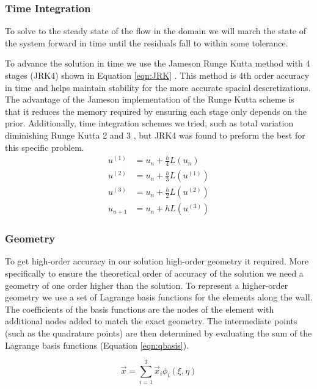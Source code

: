 \documentclass{article}
\begin{document}
	\subsubsection{Time Integration}
	To solve to the steady state of the flow in the domain we will march the state of the system forward in time until the residuals fall to within some tolerance.

	To advance the solution in time we use the Jameson Runge Kutta method with 4 stages (JRK4) shown in Equation \ref{eqn:JRK} .
	This method is 4th order accuracy in time and helps maintain stability for the more accurate spacial descretizations.
	The advantage of the Jameson implementation of the Runge Kutta scheme is that it reduces the memory required by ensuring each stage only depends on the prior.
	Additionally, time integration schemes we tried, such as total variation diminishing Runge Kutta 2 and 3 , but JRK4 was found to preform the best for this specific problem.
	\begin{equation}
	\begin{aligned} u^{(1)} &=u_{n}+\frac{h}{4} L\left(u_{n}\right) \\ u^{(2)} &=u_{n}+\frac{h}{3} L\left(u^{(1)}\right) \\ u^{(3)} &=u_{n}+\frac{h}{2} L\left(u^{(2)}\right) \\ u_{n+1} &=u_{n}+h L\left(u^{(3)}\right) \end{aligned}
		\label{eqn:JRK}
	\end{equation}



	\subsubsection{Geometry}

	To get high-order accuracy in our solution high-order geometry it required.
	More specifically to ensure the theoretical order of accuracy of the solution we need a geometry of one order higher than the solution.
	To represent a higher-order geometry we use a set of Lagrange basis functions for the elements along the wall.
	The coefficients of the basis functions are the nodes of the element with additional nodes added to match the exact geometry.
	The intermediate points (such as the quadrature points) are then determined by evaluating the sum of the Lagrange basis functions (Equation \ref{eqn:qbasis}).

	\begin{equation}
	\vec{x}=\sum_{i=1}^{3} \vec{x}_{i} \phi_{i}(\xi, \eta)
	\label{eqn:qbasis}
	\end{equation}
\end{document}
